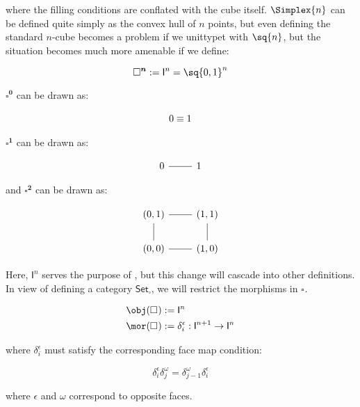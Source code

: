 \documentclass[10pt]{art.cls/art}
\newcommand{\Cube}[1]{\ensuremath{\boldsymbol{\square^{#1}}}}
\renewcommand{\I}[1]{\ensuremath{\mathsf{I}^{#1}}}
\newcommand{\CSet}{\ensuremath{\mathsf{Set}_{\boldsymbol{\square}}}}
\begin{document}
where the filling conditions are conflated with the cube itself. $\Simplex{n}$ can be defined quite simply as the convex hull of $n$ points, but even defining the standard $n$-cube becomes a problem if we unittypet with $\sq{n}$, but the situation becomes much more amenable if we define:

\begin{definition}[\Cube{n}]
  \begin{equation*}
    \Cube{n} := \I{n} = \sq{0, 1}^n
  \end{equation*}
\end{definition}

\begin{example}[$\Cube{0}$, $\Cube{1}$ and $\Cube{2}$]
  $\Cube{0}$ can be drawn as:

  $$
    \begin{tikzcd}
      0 \equiv 1
    \end{tikzcd}
  $$

  $\Cube{1}$ can be drawn as:

  \begin{equation*}
    \begin{tikzcd}
      0 \arrow[r, dash] & 1
    \end{tikzcd}
  \end{equation*}


  and $\Cube{2}$ can be drawn as:


  \begin{equation*}
    \begin{tikzcd}
      (0, 1) \arrow[r, dash] & (1, 1) \arrow[d, dash] \\
      (0, 0) \arrow[u, dash] & (1, 0) \arrow[l, dash]
    \end{tikzcd}
  \end{equation*}
\end{example}

Here, $\I{n}$ serves the purpose of , but this change will cascade into other definitions. In view of defining a category \CSet, we will restrict the morphisms in \Cube{}.

\begin{definition}[\Cube{}]
  \begin{align*}
    \obj(\Cube{}) & := \I{n}                                           \\
    \mor(\Cube{}) & := \delta^\epsilon_i : \I{n + 1} \rightarrow \I{n}
  \end{align*}

  where $\delta^\epsilon_i$ must satisfy the corresponding face map condition:

  \begin{equation*}
    \delta^\epsilon_i \delta^\omega_j = \delta^\omega_{j - 1} \delta^\epsilon_i
  \end{equation*}

  where $\epsilon$ and $\omega$ correspond to opposite faces.
\end{definition}
\end{document}
